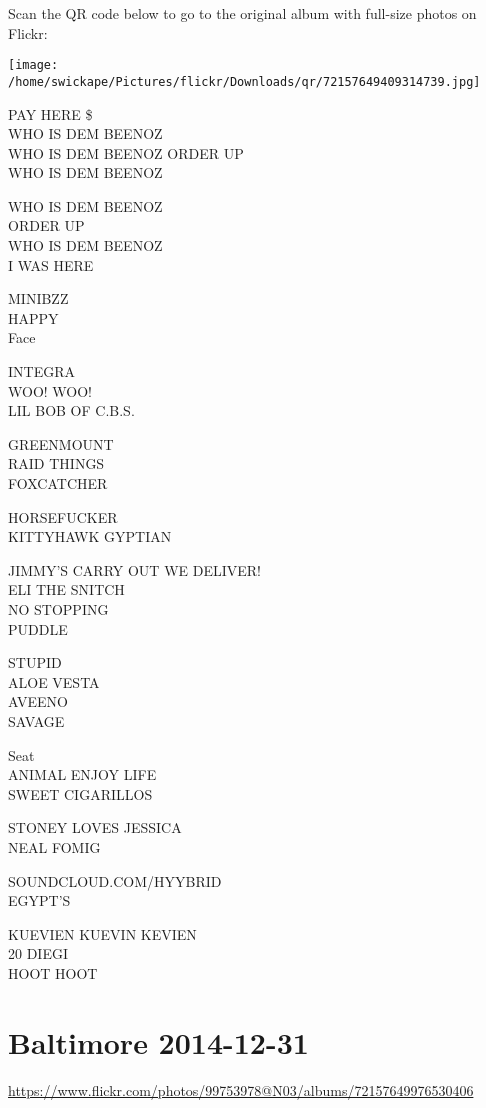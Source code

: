 \documentclass[10pt,letterpaper]{article}
\begin{document}
Scan the QR code below to go to the original album with full-size photos on Flickr:

\texttt{[image: /home/swickape/Pictures/flickr/Downloads/qr/72157649409314739.jpg]}


PAY HERE \$\\
WHO IS DEM BEENOZ\\
WHO IS DEM BEENOZ ORDER UP\\
WHO IS DEM BEENOZ

WHO IS DEM BEENOZ\\
ORDER UP\\
WHO IS DEM BEENOZ\\
I WAS HERE

MINIBZZ\\
HAPPY\\
Face

INTEGRA\\
WOO!  WOO!\\
LIL BOB OF C.B.S.

GREENMOUNT\\
RAID THINGS\\
FOXCATCHER

HORSEFUCKER\\
KITTYHAWK GYPTIAN

JIMMY'S CARRY OUT WE DELIVER!\\
ELI THE SNITCH\\
NO STOPPING\\
PUDDLE

STUPID\\
ALOE VESTA\\
AVEENO\\
SAVAGE

Seat\\
ANIMAL ENJOY LIFE\\
SWEET CIGARILLOS

STONEY LOVES JESSICA\\
NEAL FOMIG

SOUNDCLOUD.COM/HYYBRID\\
EGYPT'S

KUEVIEN KUEVIN KEVIEN\\
20 DIEGI\\
HOOT HOOT


\section*{Baltimore 2014-12-31}

\url{https://www.flickr.com/photos/99753978@N03/albums/72157649976530406}
\end{document}
